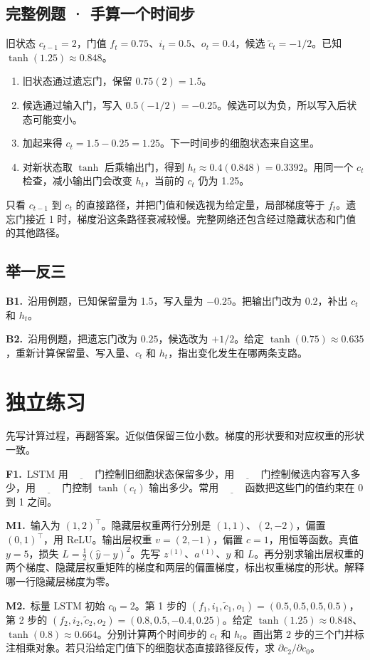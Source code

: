 \documentclass[UTF8,a4paper,11pt]{ctexart}
\newcommand{\CompactQuestion}[2]{\par\noindent\textbf{#1.}\ #2\par\vspace{.8em}}
\begin{document}
\subsection{完整例题 · 手算一个时间步}
旧状态 $c_{t-1}=2$，门值 $f_t=0.75$、$i_t=0.5$、$o_t=0.4$，候选 $\tilde c_t=-1/2$。已知 $\tanh(1.25)\approx0.848$。

\begin{enumerate}
\item 旧状态通过遗忘门，保留 $0.75(2)=1.5$。
\item 候选通过输入门，写入 $0.5(-1/2)=-0.25$。候选可以为负，所以写入后状态可能变小。
\item 加起来得 $c_t=1.5-0.25=1.25$。下一时间步的细胞状态来自这里。
\item 对新状态取 $\tanh$ 后乘输出门，得到 $h_t\approx0.4(0.848)=0.3392$。用同一个 $c_t$ 检查，减小输出门会改变 $h_t$，当前的 $c_t$ 仍为 1.25。
\end{enumerate}
只看 $c_{t-1}$ 到 $c_t$ 的直接路径，并把门值和候选视为给定量，局部梯度等于 $f_t$。遗忘门接近 1 时，梯度沿这条路径衰减较慢。完整网络还包含经过隐藏状态和门值的其他路径。

\subsection{举一反三}
\CompactQuestion{B1}{沿用例题，已知保留量为 1.5，写入量为 $-0.25$。把输出门改为 $0.2$，补出 $c_t$ 和 $h_t$。}
\CompactQuestion{B2}{沿用例题，把遗忘门改为 $0.25$，候选改为 $+1/2$。给定 $\tanh(0.75)\approx0.635$，重新计算保留量、写入量、$c_t$ 和 $h_t$，指出变化发生在哪两条支路。}
\clearpage
\section{独立练习}
先写计算过程，再翻答案。近似值保留三位小数。梯度的形状要和对应权重的形状一致。

\CompactQuestion{F1}{LSTM 用 $\underline{\qquad}$ 门控制旧细胞状态保留多少，用 $\underline{\qquad}$ 门控制候选内容写入多少，用 $\underline{\qquad}$ 门控制 $\tanh(c_t)$ 输出多少。常用 $\underline{\qquad}$ 函数把这些门的值约束在 0 到 1 之间。}
\CompactQuestion{M1}{输入为 $(1,2)^\top$。隐藏层权重两行分别是 $(1,1)$、$(2,-2)$，偏置 $(0,1)^\top$，用 ReLU。输出层权重 $v=(2,-1)$，偏置 $c=1$，用恒等函数。真值 $y=5$，损失 $L=\tfrac12(\hat y-y)^2$。先写 $z^{(1)}$、$a^{(1)}$、$\hat y$ 和 $L$。再分别求输出层权重的两个梯度、隐藏层权重矩阵的梯度和两层的偏置梯度，标出权重梯度的形状。解释哪一行隐藏层梯度为零。}
\CompactQuestion{M2}{标量 LSTM 初始 $c_0=2$。第 1 步的 $(f_1,i_1,\tilde c_1,o_1)=(0.5,0.5,0.5,0.5)$，第 2 步的 $(f_2,i_2,\tilde c_2,o_2)=(0.8,0.5,-0.4,0.25)$。给定 $\tanh(1.25)\approx0.848$、$\tanh(0.8)\approx0.664$。分别计算两个时间步的 $c_t$ 和 $h_t$。画出第 2 步的三个门并标注相乘对象。若只沿给定门值下的细胞状态直接路径反传，求 $\partial c_2/\partial c_0$。}
\clearpage
\end{document}
